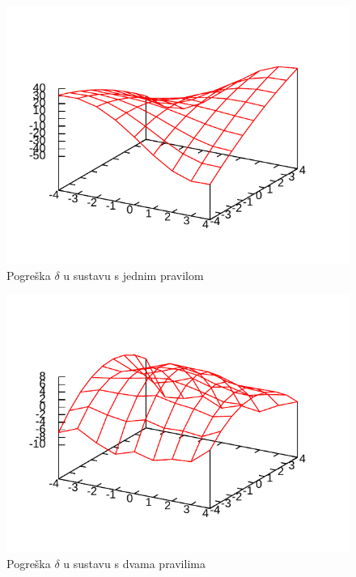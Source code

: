 \documentclass{article}
\begin{document}
\begin{figure}[h]
    \centering
    \includegraphics{img/errors-batch-1.pdf}
    \caption{Pogreška $ \delta $ u sustavu s jednim pravilom}
    \label{err-1}
\end{figure}

\begin{figure}[h]
    \centering
    \includegraphics{img/errors-batch-2.pdf}
    \caption{Pogreška $ \delta $ u sustavu s dvama pravilima}
    \label{err-2}
\end{figure}
\end{document}
